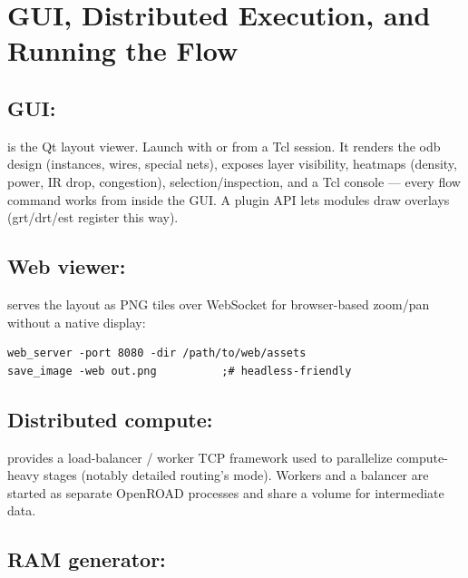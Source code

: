 \chapter{GUI, Distributed Execution, and Running the Flow}
\label{ch:gui}


\section{GUI: }

 is the Qt layout viewer. Launch with  or
 from a Tcl session. It renders the odb design (instances,
wires, special nets), exposes layer visibility, heatmaps (density, power, IR
drop, congestion), selection/inspection, and a Tcl console --- every flow
command works from inside the GUI. A  plugin API lets modules
draw overlays (grt/drt/est register this way).

\section{Web viewer: }

 serves the layout as PNG tiles over WebSocket for browser-based
zoom/pan without a native display:

\begin{lstlisting}[style=ortcl]
web_server -port 8080 -dir /path/to/web/assets
save_image -web out.png          ;# headless-friendly
\end{lstlisting}

\section{Distributed compute: }

 provides a load-balancer / worker TCP framework used to
parallelize compute-heavy stages (notably detailed routing's
 mode). Workers and a balancer are started as separate
OpenROAD processes and share a volume for intermediate data.

\section{RAM generator: }

